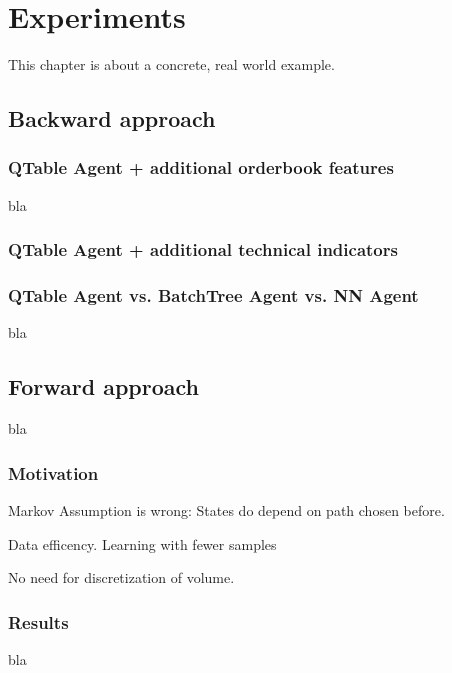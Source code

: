 \chapter{Experiments}
\label{chap:experiments}
This chapter is about a concrete, real world example.

\section{Backward approach}

\subsection{QTable Agent + additional orderbook features}
bla

\subsection{QTable Agent + additional technical indicators}

\subsection{QTable Agent vs. BatchTree Agent vs. NN Agent}
bla




\section{Forward approach}
bla

\subsection{Motivation}
Markov Assumption is wrong: States do depend on path chosen before.

Data efficency. Learning with fewer samples

No need for discretization of volume.

\subsection{Results}
bla





\cleardoublepage{}
